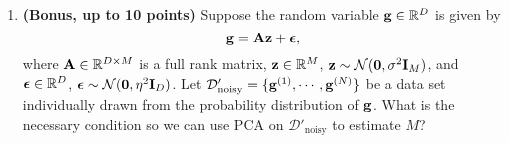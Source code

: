 \documentclass[12pt,a4paper]{article}
\renewcommand{\v}[1]{\ifmmode\mathbf{#1}\fi}
\newcommand{\x}{\times}
\def\R{\ifmmode\mathbb R\fi}
\begin{document}
\begin{enumerate}[label=(\alph*)]
	\item \textbf{(Bonus, up to 10 points)} 
	Suppose the random variable $\v g  \in \R^D$ is given by 
	\begin{equation*}
		\v g = \v A \v z + \boldsymbol\epsilon,
	\end{equation*}
	where $\v A \in \R^{D\x M}$ is a full rank matrix, $\v z \in \R^M$, $\v z \sim \mathcal N(\v 0, \sigma^2 \v I_M)$, and $\boldsymbol\epsilon\in\R^D$, $\boldsymbol\epsilon \sim \mathcal N(\v 0, \eta^2 \v I_D)$. Let $\mathcal D'_{\text{noisy}} = \{\v g^{(1)}, \cdots, \v g^{(N)} \}$ be a data set individually drawn from the probability distribution of $\v g$. What is the necessary condition so we can use PCA on $\mathcal D'_{\text{noisy}}$ to estimate $M$?
\end{enumerate}
\end{document}
